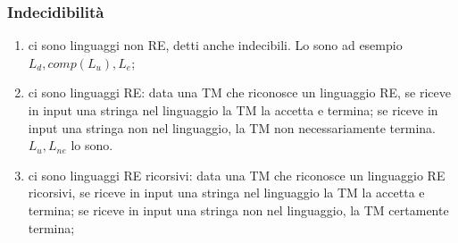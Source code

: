 \documentclass[a4paper,11pt]{article}
\begin{document}
\subsubsection{Indecidibilità}
\begin{enumerate}
    \item ci sono linguaggi non RE, detti anche indecibili. Lo sono ad esempio $L_d, comp(L_u), L_{e}$;
    \item ci sono linguaggi RE: data una TM che riconosce un linguaggio RE, se riceve in input una stringa nel linguaggio la TM la accetta e termina; se riceve in input una stringa non nel linguaggio, la TM non necessariamente termina. $L_u, L_{ne}$ lo sono.
    \item ci sono linguaggi RE ricorsivi: data una TM che riconosce un linguaggio RE ricorsivi, se riceve in input una stringa nel linguaggio la TM la accetta e termina; se riceve in input una stringa non nel linguaggio, la TM certamente termina;
\end{enumerate}
\end{document}
